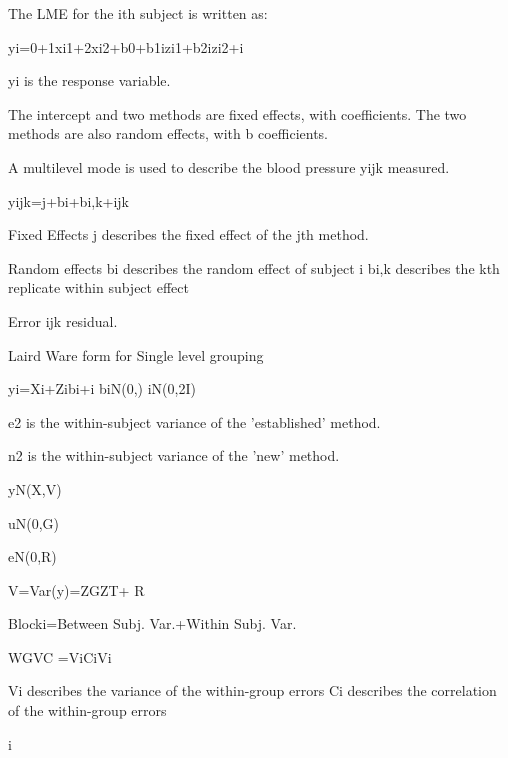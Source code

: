  
 
The LME for the ith subject is written as:
 
yi=0+1xi1+2xi2+b0+b1izi1+b2izi2+i 
 
 
yi is the response variable.
 
The intercept and two methods are fixed effects, with  coefficients.
The two methods are also random effects, with b coefficients.
 
 
 
 
 
 
 
A multilevel mode is used to describe the blood pressure yijk measured.
 
yijk=j+bi+bi,k+ijk
 
Fixed Effects 
j describes the fixed effect of the jth method.
 
Random effects
bi describes the random effect of subject i
bi,k describes the kth replicate within subject effect 
 
Error
ijk residual.
 
 
 
 
 
 
Laird Ware form for Single level grouping
 
yi=Xi+Zibi+i 
biN(0,)
iN(0,2I)
 
 
 
 
 
 

 
e2 is the within-subject variance of the 'established' method.
 
 
n2 is the within-subject variance of the 'new' method.
 
 
 
 
 
 
 
yN(X,V) 
 
uN(0,G)
 
eN(0,R)
  
V=Var(y)=ZGZT+ R
 
 
Blocki=Between Subj. Var.+Within Subj. Var. 
 
 
WGVC =ViCiVi
 
Vi describes the variance of the within-group errors 
Ci describes the correlation of the within-group errors 
 
i 
